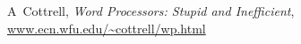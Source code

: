 \begin{thebibliography}{9999}

	A~Cottrell, \textsl{Word Processors: Stupid and Inefficient},\\
	\mbox{} \hfill \url{www.ecn.wfu.edu/\~cottrell/wp.html}

\end{thebibliography}

